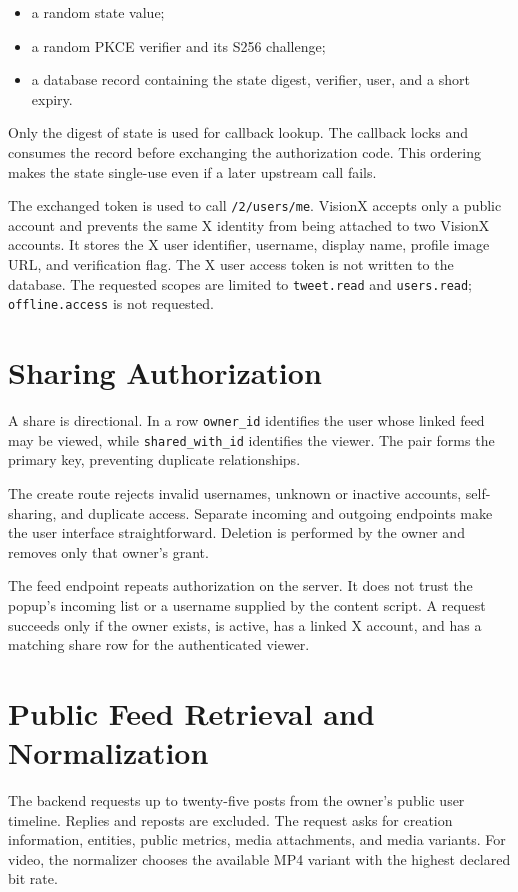 \documentclass[11pt,a4paper]{report}
\newcommand{\code}[1]{\texttt{#1}}
\begin{document}
\begin{itemize}
  \item a random state value;
  \item a random PKCE verifier and its S256 challenge;
  \item a database record containing the state digest, verifier, user, and a
  short expiry.
\end{itemize}

Only the digest of state is used for callback lookup. The callback locks and
consumes the record before exchanging the authorization code. This ordering
makes the state single-use even if a later upstream call fails.

The exchanged token is used to call \code{/2/users/me}. VisionX accepts only a
public account and prevents the same X identity from being attached to two
VisionX accounts. It stores the X user identifier, username, display name,
profile image URL, and verification flag. The X user access token is not
written to the database. The requested scopes are limited to
\code{tweet.read} and \code{users.read}; \code{offline.access} is not
requested.

\section{Sharing Authorization}
A share is directional. In a row \code{owner\_id} identifies the user whose
linked feed may be viewed, while \code{shared\_with\_id} identifies the viewer.
The pair forms the primary key, preventing duplicate relationships.

The create route rejects invalid usernames, unknown or inactive accounts,
self-sharing, and duplicate access. Separate incoming and outgoing endpoints
make the user interface straightforward. Deletion is performed by the owner
and removes only that owner's grant.

The feed endpoint repeats authorization on the server. It does not trust the
popup's incoming list or a username supplied by the content script. A request
succeeds only if the owner exists, is active, has a linked X account, and has a
matching share row for the authenticated viewer.

\section{Public Feed Retrieval and Normalization}
The backend requests up to twenty-five posts from the owner's public user
timeline. Replies and reposts are excluded. The request asks for creation
information, entities, public metrics, media attachments, and media variants.
For video, the normalizer chooses the available MP4 variant with the highest
declared bit rate.
\end{document}
